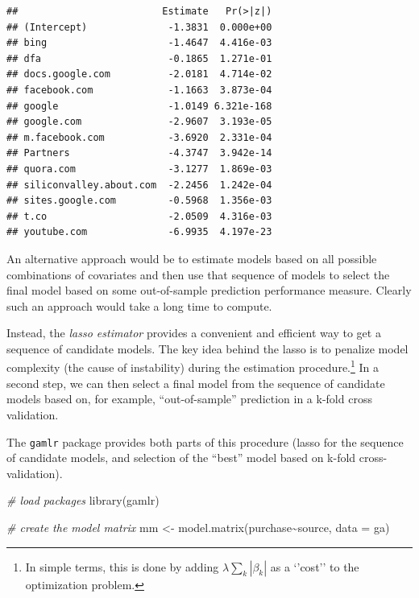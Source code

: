 \documentclass[
  12pt,
]{style/krantz}
\newenvironment{Shaded}{\begin{snugshade}}{\end{snugshade}}
\newcommand{\AttributeTok}[1]{\textcolor[rgb]{0.77,0.63,0.00}{#1}}
\newcommand{\CommentTok}[1]{\textcolor[rgb]{0.56,0.35,0.01}{\textit{#1}}}
\newcommand{\FunctionTok}[1]{\textcolor[rgb]{0.00,0.00,0.00}{#1}}
\newcommand{\NormalTok}[1]{#1}
\newcommand{\OtherTok}[1]{\textcolor[rgb]{0.56,0.35,0.01}{#1}}
\newcommand{\SpecialCharTok}[1]{\textcolor[rgb]{0.00,0.00,0.00}{#1}}
\newcommand{\StringTok}[1]{\textcolor[rgb]{0.31,0.60,0.02}{#1}}
\begin{document}
\begin{Shaded}
\end{Shaded}

\begin{verbatim}
##                         Estimate   Pr(>|z|)
## (Intercept)              -1.3831  0.000e+00
## bing                     -1.4647  4.416e-03
## dfa                      -0.1865  1.271e-01
## docs.google.com          -2.0181  4.714e-02
## facebook.com             -1.1663  3.873e-04
## google                   -1.0149 6.321e-168
## google.com               -2.9607  3.193e-05
## m.facebook.com           -3.6920  2.331e-04
## Partners                 -4.3747  3.942e-14
## quora.com                -3.1277  1.869e-03
## siliconvalley.about.com  -2.2456  1.242e-04
## sites.google.com         -0.5968  1.356e-03
## t.co                     -2.0509  4.316e-03
## youtube.com              -6.9935  4.197e-23
\end{verbatim}

An alternative approach would be to estimate models based on all possible combinations of covariates and then use that sequence of models to select the final model based on some out-of-sample prediction performance measure. Clearly such an approach would take a long time to compute.

Instead, the \emph{lasso estimator} provides a convenient and efficient way to get a sequence of candidate models. The key idea behind the lasso is to penalize model complexity (the cause of instability) during the estimation procedure.\footnote{In simple terms, this is done by adding \(\lambda\sum_k{|\beta_k|}\) as a `'cost'' to the optimization problem.} In a second step, we can then select a final model from the sequence of candidate models based on, for example, ``out-of-sample'' prediction in a k-fold cross validation.

The \texttt{gamlr} package provides both parts of this procedure (lasso for the sequence of candidate models, and selection of the ``best'' model based on k-fold cross-validation).

\begin{Shaded}
\begin{Highlighting}[]
\CommentTok{\# load packages}
\FunctionTok{library}\NormalTok{(gamlr)}

\CommentTok{\# create the model matrix}
\NormalTok{mm }\OtherTok{\textless{}{-}} \FunctionTok{model.matrix}\NormalTok{(purchase}\SpecialCharTok{\textasciitilde{}}\NormalTok{source, }\AttributeTok{data =}\NormalTok{ ga)}
\end{Highlighting}
\end{Shaded}
\end{document}
